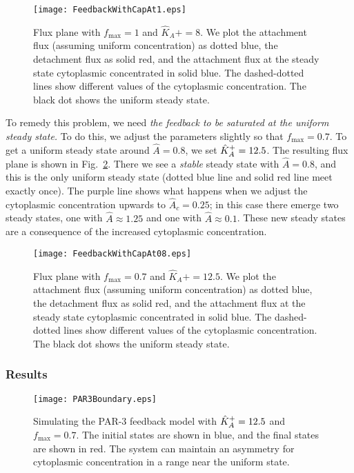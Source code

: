 \documentclass[11pt]{article}
\newcommand{\6}[1]{#1_{\text{6}}}
\newcommand{\3}[1]{#1_{\text{3}}}
\begin{document}
\begin{figure}
\centering
\texttt{[image: FeedbackWithCapAt1.eps]}
\caption{\label{fig:P3FB1}Flux plane with $f_\text{max}=1$ and $\hat K_A+=8$. We plot the attachment flux (assuming uniform concentration) as dotted blue, the detachment flux as solid red, and the attachment flux at the steady state cytoplasmic concentrated in solid blue. The dashed-dotted lines show different values of the cytoplasmic concentration. The black dot shows the uniform steady state.}
\end{figure}

To remedy this problem, we need \emph{the feedback to be saturated at the uniform steady state.} To do this, we adjust the parameters slightly so that $f_\text{max}=0.7$. To get a uniform steady state around $\hat A = 0.8$, we set $\hat{K}^\text{+}_A=12.5$. The resulting flux plane is shown in Fig.\ \ref{fig:P3FB08}. There we see a \emph{stable} steady state with $\hat A = 0.8$, and this is the only uniform steady state (dotted blue line and solid red line meet exactly once). The purple line shows what happens when we adjust the cytoplasmic concentration upwards to $\hat{A}_c=0.25$; in this case there emerge two steady states, one with $\hat{A}\approx 1.25$ and one with $\hat A \approx 0.1$. These new steady states are a consequence of the increased cytoplasmic concentration.

\begin{figure}
\centering
\texttt{[image: FeedbackWithCapAt08.eps]}
\caption{\label{fig:P3FB08}Flux plane with $f_\text{max}=0.7$ and $\hat K_A+=12.5$. We plot the attachment flux (assuming uniform concentration) as dotted blue, the detachment flux as solid red, and the attachment flux at the steady state cytoplasmic concentrated in solid blue. The dashed-dotted lines show different values of the cytoplasmic concentration. The black dot shows the uniform steady state.}
\end{figure}


\subsubsection{Results}
\begin{figure}
\centering
\texttt{[image: PAR3Boundary.eps]}
\caption{\label{fig:P3FBBd}Simulating the PAR-3 feedback model with $\hat{K}^\text{+}_A=12.5$ and $f_\text{max}=0.7$. The initial states are shown in blue, and the final states are shown in red. The system can maintain an asymmetry for cytoplasmic concentration in a range near the uniform state.}
\end{figure}
\end{document}
